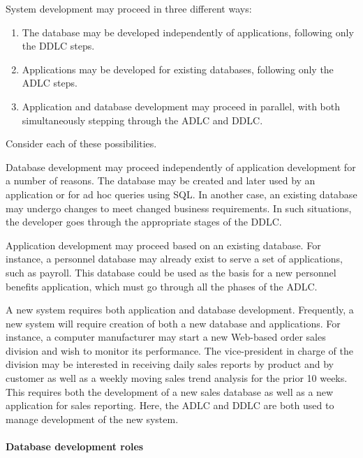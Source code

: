 \documentclass[
]{article}
\begin{document}
System development may proceed in three different ways:

\begin{enumerate}
\def\labelenumi{\arabic{enumi}.}
\item
  The database may be developed independently of applications,
  following only the DDLC steps.
\item
  Applications may be developed for existing databases, following only
  the ADLC steps.
\item
  Application and database development may proceed in parallel, with
  both simultaneously stepping through the ADLC and DDLC.
\end{enumerate}

Consider each of these possibilities.

Database development may proceed independently of application
development for a number of reasons. The database may be created and
later used by an application or for ad hoc queries using SQL. In another
case, an existing database may undergo changes to meet changed business
requirements. In such situations, the developer goes through the
appropriate stages of the DDLC.

Application development may proceed based on an existing database. For
instance, a personnel database may already exist to serve a set of
applications, such as payroll. This database could be used as the basis
for a new personnel benefits application, which must go through all the
phases of the ADLC.

A new system requires both application and database development.
Frequently, a new system will require creation of both a new database
and applications. For instance, a computer manufacturer may start a new
Web-based order sales division and wish to monitor its performance. The
vice-president in charge of the division may be interested in receiving
daily sales reports by product and by customer as well as a weekly
moving sales trend analysis for the prior 10 weeks. This requires both
the development of a new sales database as well as a new application for
sales reporting. Here, the ADLC and DDLC are both used to manage
development of the new system.

\hypertarget{database-development-roles}{%
\paragraph*{Database development roles}\label{database-development-roles}}
\end{document}
